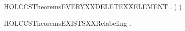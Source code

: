 \newcommand{\HOLCCSTheoremsDELETEXXELEMENTXXFILTER}{\UseVerbatim{HOLCCSTheoremsDELETEXXELEMENTXXFILTER}}
\begin{SaveVerbatim}{HOLCCSTheoremsEVERYXXDELETEXXELEMENT}
\HOLTokenTurnstile{} \HOLSymConst{\HOLTokenForall{}}  .   \HOLSymConst{\HOLTokenConj{}}   (  ) \HOLSymConst{\HOLTokenImp{}}   
\end{SaveVerbatim}
\newcommand{\HOLCCSTheoremsEVERYXXDELETEXXELEMENT}{\UseVerbatim{HOLCCSTheoremsEVERYXXDELETEXXELEMENT}}
\begin{SaveVerbatim}{HOLCCSTheoremsEXISTSXXRelabeling}
\HOLTokenTurnstile{} \HOLSymConst{\HOLTokenExists{}}.  
\end{SaveVerbatim}
\newcommand{\HOLCCSTheoremsEXISTSXXRelabeling}{\UseVerbatim{HOLCCSTheoremsEXISTSXXRelabeling}}

